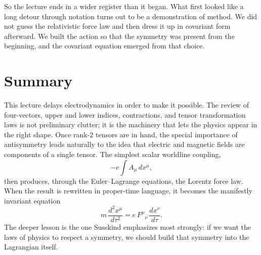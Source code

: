So the lecture ends in a wider register than it began. What first looked like a long detour through notation turns out to be a demonstration of method. We did not guess the relativistic force law and then dress it up in covariant form afterward. We built the action so that the symmetry was present from the beginning, and the covariant equation emerged from that choice.

\section{Summary}

This lecture delays electrodynamics in order to make it possible. The review of four-vectors, upper and lower indices, contractions, and tensor transformation laws is not preliminary clutter; it is the machinery that lets the physics appear in the right shape. Once rank-$2$ tensors are in hand, the special importance of antisymmetry leads naturally to the idea that electric and magnetic fields are components of a single tensor. The simplest scalar worldline coupling,
\[
-e\int A_\mu\,dx^\mu,
\]
then produces, through the Euler--Lagrange equations, the Lorentz force law. When the result is rewritten in proper-time language, it becomes the manifestly invariant equation
\[
m\,\frac{d^2x^\mu}{d\tau^2}
=
e\,F^\mu{}_\nu\,\frac{dx^\nu}{d\tau}.
\]
The deeper lesson is the one Susskind emphasizes most strongly: if we want the laws of physics to respect a symmetry, we should build that symmetry into the Lagrangian itself.